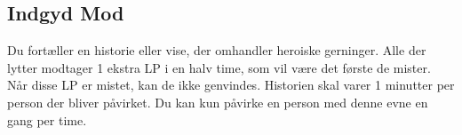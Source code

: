 \subsection{Indgyd Mod}
Du fortæller en historie eller vise, der omhandler heroiske gerninger. Alle der lytter modtager 1 ekstra LP i en halv time, som vil være det første de mister. Når disse LP er mistet, kan de ikke genvindes. Historien skal varer 1 minutter per person der bliver påvirket. Du kan kun påvirke en person med denne evne en gang per time.